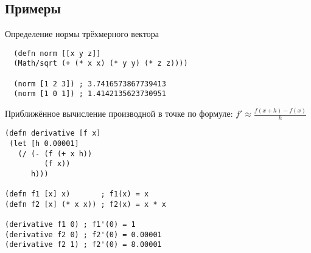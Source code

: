 \subsection{Примеры}

Определение нормы трёхмерного вектора

\begin{verbatim}
  (defn norm [[x y z]]
  (Math/sqrt (+ (* x x) (* y y) (* z z))))

  (norm [1 2 3]) ; 3.7416573867739413
  (norm [1 0 1]) ; 1.4142135623730951
\end{verbatim}

Приближённое вычисление производной в точке по формуле: \( f' \approx \frac{f(x+h) - f(x)}{h}\)

\begin{verbatim}
(defn derivative [f x]
 (let [h 0.00001]
   (/ (- (f (+ x h))
         (f x))
      h)))

(defn f1 [x] x)       ; f1(x) = x
(defn f2 [x] (* x x)) ; f2(x) = x * x

(derivative f1 0) ; f1'(0) = 1
(derivative f2 0) ; f2'(0) = 0.00001
(derivative f2 1) ; f2'(0) = 8.00001
\end{verbatim}

